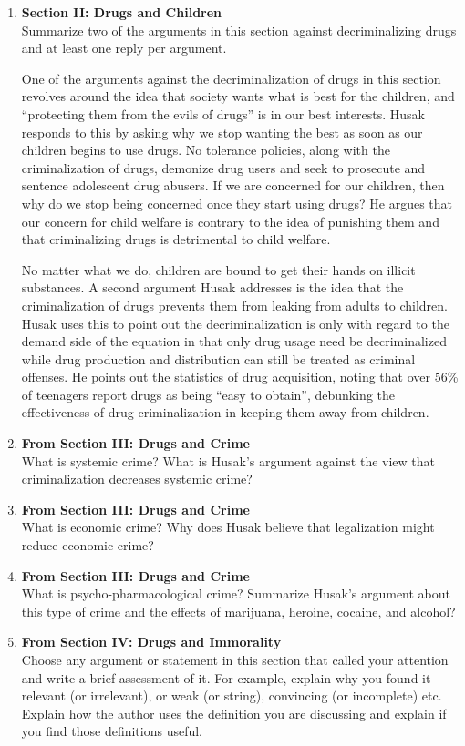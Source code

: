 \documentclass{article}
\begin{document}
\begin{enumerate}
  \item \textbf{Section II: Drugs and Children} \\
  Summarize two of the arguments in this section against decriminalizing drugs and at least one reply per argument.
  \par One of the arguments against the decriminalization of drugs in this section revolves around the idea that society wants what is best for the children, and ``protecting them from the evils of drugs'' is in our best interests. Husak responds to this by asking why we stop wanting the best as soon as our children begins to use drugs. No tolerance policies, along with the criminalization of drugs, demonize drug users and seek to prosecute and sentence adolescent drug abusers. If we are concerned for our children, then why do we stop being concerned once they start using drugs? He argues that our concern for child welfare is contrary to the idea of punishing them and that criminalizing drugs is detrimental to child welfare.
  \par No matter what we do, children are bound to get their hands on illicit substances. A second argument Husak addresses is the idea that the criminalization of drugs prevents them from leaking from adults to children. Husak uses this to point out the decriminalization is only with regard to the demand side of the equation in that only drug usage need be decriminalized while drug production and distribution can still be treated as criminal offenses. He points out the statistics of drug acquisition, noting that over 56\% of teenagers report drugs as being ``easy to obtain'', debunking the effectiveness of drug criminalization in keeping them away from children.
  \item \textbf{From Section III: Drugs and Crime} \\
  What is systemic crime? What is Husak's argument against the view that criminalization decreases systemic crime?
  \item \textbf{From Section III: Drugs and Crime} \\
  What is economic crime? Why does Husak believe that legalization might reduce economic crime?
  \item \textbf{From Section III: Drugs and Crime} \\
  What is psycho-pharmacological crime? Summarize Husak's argument about this type of crime and the effects of marijuana, heroine, cocaine, and alcohol?
  \item \textbf{From Section IV: Drugs and Immorality} \\
  Choose any argument or statement in this section that called your attention and write a brief assessment of it. For example, explain why you found it relevant (or irrelevant), or weak (or string), convincing (or incomplete) etc. Explain how the author uses the definition you are discussing and explain if you find those definitions useful.
\end{enumerate}
\end{document}
